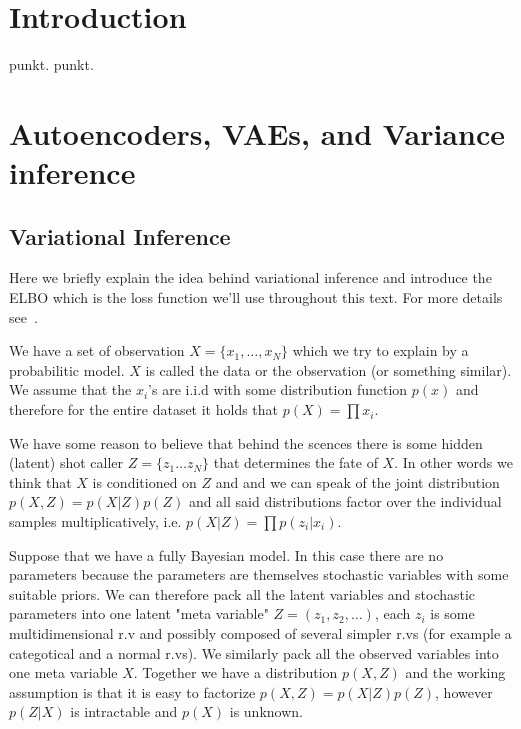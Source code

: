 \documentclass[11pt, a4paper]{report}
\theoremstyle{plain}
\theoremstyle{definition}
\theoremstyle{remark}
\begin{document}
\listoftables

\listoffigures

\tableofcontents

\chapter{Introduction}
punkt.
punkt.

\chapter{Autoencoders, VAEs, and Variance inference}

\section{Variational Inference}
Here we briefly explain the idea behind variational inference and introduce the
ELBO which is the loss function we'll use throughout this text.
For more details see~.

We have a set of observation $X = \{x_1, \dots , x_N\}$ which we try to explain
by a probabilitic model. 
$X$ is called the data or the observation (or something similar). We assume that
the $x_i$'s are i.i.d with some distribution function $p(x)$ and therefore for
the entire dataset it holds that $p(X) = \prod x_i$.

We have some reason to believe that behind the scences there is some hidden
(latent) shot caller $Z = \{z_1 \dots z_N\}$ that determines the fate of $X$.
In other words we think that $X$ is conditioned on $Z$ and and we can speak of
the joint distribution $p(X,Z) = p(X|Z)p(Z)$ and all said distributions factor
over the individual samples multiplicatively, i.e.
$p(X|Z) = \prod p(z_i | x_i)$.

Suppose that we have a fully Bayesian model. In this case there are no
parameters because the parameters are themselves stochastic variables with some
suitable priors. We can therefore pack all the latent variables and stochastic
parameters into one latent "meta variable" $Z = (z_1, z_2, \dots )$, each $z_i$
is some multidimensional r.v and possibly composed of several simpler r.vs (for
example a categotical and a normal r.vs).
We similarly pack all the observed variables into one meta variable $X$.
Together we have a distribution $p(X,Z)$ and the working assumption is that it
is easy to factorize $p(X,Z) = p(X|Z)p(Z)$, however $p(Z|X)$ is intractable and
$p(X)$ is unknown.
\end{document}
